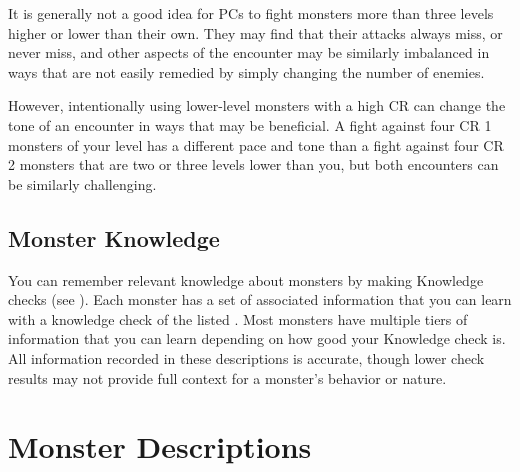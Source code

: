        It is generally not a good idea for PCs to fight monsters more than three levels higher or lower than their own.
        They may find that their attacks always miss, or never miss, and other aspects of the encounter may be similarly imbalanced in ways that are not easily remedied by simply changing the number of enemies.

        However, intentionally using lower-level monsters with a high CR can change the tone of an encounter in ways that may be beneficial.
        A fight against four CR 1 monsters of your level has a different pace and tone than a fight against four CR 2 monsters that are two or three levels lower than you, but both encounters can be similarly challenging.

    \subsection{Monster Knowledge}
        You can remember relevant knowledge about monsters by making Knowledge checks (see ).
        Each monster has a set of associated information that you can learn with a knowledge check of the listed .
        Most monsters have multiple tiers of information that you can learn depending on how good your Knowledge check is.
        All information recorded in these descriptions is accurate, though lower check results may not provide full context for a monster's behavior or nature.

\section{Monster Descriptions}


